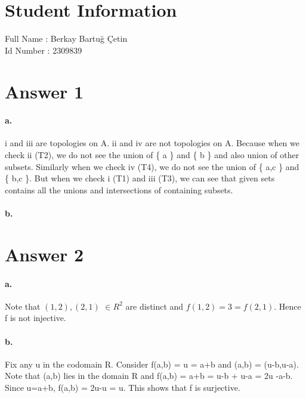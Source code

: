 \documentclass[11pt]{article}
\begin{document}
\section*{Student Information } 
Full Name :  Berkay Bartuğ Çetin \\
Id Number : 2309839 \\

\section*{Answer 1}
\paragraph{a.}
i and iii are topologies on A. ii and iv are not topologies on A.
\newline Because when we check ii (T2), we do not see the union of \{ a \} and \{ b \} and also union of other subsets.
\newline Similarly when we check iv (T4), we do not see the union of \{ a,c \} and \{ b,c \}.
\newline But when we check i (T1) and iii (T3), we can see that given sets contains all the unions and intersections of containing subsets.

\paragraph{b.}

\section*{Answer 2}
\paragraph{a.}
 Note that $(1,2),(2,1)$ $\in R^2$ are distinct and $f(1,2) = 3 = f(2,1)$. Hence f is not injective.
\paragraph{b.} 
 Fix any u in the codomain R. Consider f(a,b) = u = a+b and (a,b) = (u-b,u-a).
\newline Note that (a,b) lies in the domain R and f(a,b) = a+b = u-b + u-a = 2u -a-b.
\newline Since u=a+b, f(a,b) = 2u-u = u. This shows that f is surjective.
\end{document}
